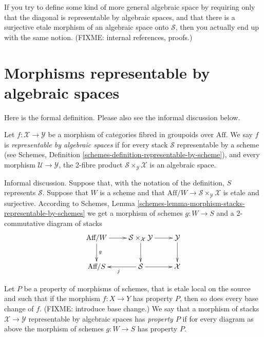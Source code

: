 \begin{remark}
\label{remark-definition-correct}
If you try to define some kind of more general algebraic space by requiring
only that the diagonal is representable by algebraic spaces, and that there is
a surjective etale morphism of an algebraic space onto $\mathcal{S}$, then 
you actually end up with the same notion.
(FIXME: internal references, proofs.)
\end{remark}

\section{Morphisms representable by algebraic spaces}
\label{section-morphism-representable-by-algebraic-spaces}

\noindent
Here is the formal definition. Please also see the informal discussion below.

\begin{definition}
\label{definition-representable-by-algebraic-spaces}
Let $f : \mathcal{X} \to \mathcal{Y}$ be a morphism of categories
fibred in groupoids over $\text{Aff}$. We say $f$ is
{\it representable by algebraic spaces}
if for every stack $\mathcal{S}$ representable by a scheme
(see Schemes, Definition \ref{schemes-definition-representable-by-scheme}),
and every morphism $\mathcal{U} \to \mathcal{Y}$, the 2-fibre product
$\mathcal{S}\times_\mathcal{Y}\mathcal{X}$ is an algebraic space.
\end{definition}

\noindent
Informal discussion. Suppose that, with the notation of the definition,
$S$ represents $\mathcal{S}$. Suppose that $W$ is a scheme and that
$\text{Aff}/W \to \mathcal{S}\times_\mathcal{Y}\mathcal{X}$ is 
etale and surjective. According to
Schemes, Lemma \ref{schemes-lemma-morphism-stacks-representable-by-schemes}
we get a morphism of schemes $g : W \to S$ and a 2-commutative diagram
of stacks
$$
\xymatrix{
\text{Aff}/W \ar[d]^g \ar[r] &
\mathcal{S}\times_\mathcal{X}\mathcal{Y} \ar[d] \ar[r] &
\mathcal{Y} \ar[d] \\
\text{Aff}/S &
\mathcal{S} \ar[l]^j \ar[r] & \mathcal{X}
}
$$

\begin{definition}
\label{definition-property-morphism-representable-by-algebraic-spaces}
Let $P$ be a property of morphisms of schemes, that is etale local
on the source and such that if the morphism $f : X \to Y$ has property $P$,
then so does every base change of $f$. (FIXME: introduce base change.)
We say that a morphism of stacks $\mathcal{X}
\to \mathcal{Y}$ representable by algebraic spaces has
{\it property $P$} if for every diagram as above the morphism of schemes
$g : W \to S$ has property $P$.
\end{definition}

